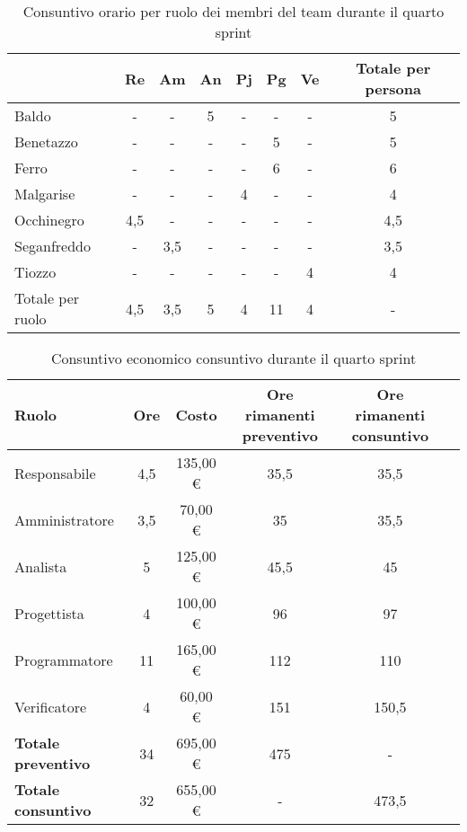 \begin{table}[!h]
    \centering
    \begin{tabular}{ | l | c | c | c | c | c | c | c | }
        \hline
        \textbf{} & \textbf{Re} & \textbf{Am} &\textbf{An} & \textbf{Pj} & \textbf{Pg} & \textbf{Ve} & \textbf{Totale per persona} \\
        \hline
        Baldo            &  -   &  -   &  5   &  -   &  -   &  -   &  5   \\
        Benetazzo        &  -   &  -   &  -   &  -   &  5   &  -   &  5   \\
        Ferro            &  -   &  -   &  -   &  -   &  6   &  -   &  6   \\
        Malgarise        &  -   &  -   &  -   &  4   &  -   &  -   &  4   \\
        Occhinegro       &  4,5   &  -   &  -   &  -   &  -   &  -   &  4,5   \\
        Seganfreddo      &  -   &  3,5   &  -   &  -   &  -   &  -   &  3,5   \\
        Tiozzo           &  -   &  -   &  -   &  -   &  -   &  4   &  4   \\
        \hline
        Totale per ruolo &  4,5   &  3,5   &  5   &  4   &  11   &  4   &  -   \\
        \hline
    \end{tabular}
    \caption{Consuntivo orario per ruolo dei membri del team durante il quarto sprint}
    \label{tab:26}
\end{table}
\begin{table}[!h]
    \centering
    \begin{tabular}{ | l | c | c | c | c | c | }
        \hline
        \textbf{Ruolo} & \textbf{Ore} & \textbf{Costo} & \textbf{Ore rimanenti preventivo} & \textbf{Ore rimanenti consuntivo} \\
        \hline
        Responsabile               &  4,5  &   135,00 € &   35,5   &   35,5   \\
        Amministratore             &  3,5  &   70,00 € &   35   &   35,5   \\
        Analista                   &  5  &   125,00 € &   45,5   &   45   \\
        Progettista                &  4  &   100,00 € &   96   &   97   \\
        Programmatore              &  11  &   165,00 € &   112   &   110   \\
        Verificatore               &  4  &   60,00 € &   151   &   150,5   \\
        \hline
        \textbf{Totale preventivo} &  34   &    695,00 € &   475   &   -   \\
        \hline
        \textbf{Totale consuntivo} &  32   &    655,00 € &   -   &   473,5   \\
        \hline
    \end{tabular}
    \caption{Consuntivo economico consuntivo durante il quarto sprint}
    \label{tab:27}
\end{table}
